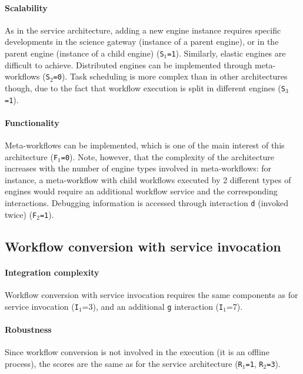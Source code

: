 \documentclass[preprint,3p,twocolumn]{elsarticle}
\newcommand{\correction}[1]{\color{blue}#1\color{black}\xspace}
\begin{document}
\paragraph{Scalability} As in the service architecture, adding a new
engine instance requires specific developments in the science gateway
(instance of a parent engine), or in the parent engine (instance of a
child engine) (\texttt{S$_1$=1}). Similarly, elastic engines are
difficult to achieve. Distributed engines can be implemented through meta-workflows (\texttt{S$_2$=0}). Task scheduling
is more complex than in other architectures though, due to the fact
that workflow execution is split in different engines (\texttt{S$_3$=1}).

\paragraph{\correction{Functionality}}
Meta-workflows can be implemented, which is one of the main interest
of this architecture (\texttt{\correction{F}$_1$=0}). Note, however, that the
complexity of the architecture increases with the number of engine
types involved in meta-workflows: for instance, a meta-workflow with
child workflows executed by 2 different types of engines would require
an additional workflow service and the corresponding interactions.
Debugging information is accessed through interaction \texttt{d}
(invoked twice) (\texttt{\correction{F}$_2$=1}).

\subsection{Workflow conversion with service invocation}

\paragraph{Integration complexity} Workflow conversion with service invocation
requires the same components as for service invocation
(\texttt{I$_1$}=3), and an additional \texttt{g} interaction (\texttt{I$_1$}=7).

\paragraph{Robustness} Since workflow conversion is not involved in
the execution (it is an offline process), the scores are the same as for the
service architecture (\texttt{R$_1$=1}, \texttt{R$_2$=3}).
\end{document}

